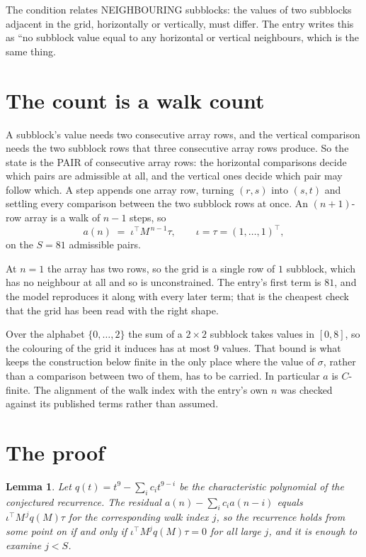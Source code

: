 \documentclass[11pt,a4paper]{article}
\theoremstyle{plain}
\newtheorem{lemma}[theorem]{Lemma}
\theoremstyle{definition}
\begin{document}
The condition relates NEIGHBOURING subblocks: the values of two subblocks adjacent in the grid,
horizontally or vertically, must differ. The entry writes this as ``no subblock value equal to any horizontal or vertical neighbours, which is the same thing.

\section{The count is a walk count}

A subblock's value needs two consecutive array rows, and the vertical
comparison needs the two subblock rows that three consecutive array rows produce. So the state
is the PAIR of consecutive array rows: the horizontal comparisons decide which pairs are
admissible at all, and the vertical ones decide which pair may follow which. A step appends one
array row, turning $(r,s)$ into $(s,t)$ and settling every comparison between the two subblock
rows at once. An $(n+1)$-row array is a walk of $n-1$ steps, so
\[
a(n)\;=\;\iota^{\!\top}M^{\,n-1}\tau,\qquad\iota=\tau=(1,\dots,1)^{\!\top},
\]
on the $S=81$ admissible pairs.

At $n=1$ the array has two rows, so the grid is a single row of $1$
subblock, which has no neighbour at all and so is unconstrained. The
entry's first term is $81$, and the model reproduces it along with every later term; that
is the cheapest check that the grid has been read with the right shape.

Over the alphabet $\{0,\dots,2\}$ the sum of a $2\times2$ subblock takes values in
$[0,8]$, so the colouring of the grid it induces has at most $9$ values.
That bound is what keeps the construction below finite in the only place where the value of
$\sigma$, rather than a comparison between two of them, has to be carried.
In particular $a$ is $C$-finite. The alignment of the walk index with the entry's own $n$ was
checked against its published terms rather than assumed.

\section{The proof}

\begin{lemma}\label{lem:crit}
Let $q(t)=t^{9}-\sum_i c_it^{9-i}$ be the characteristic polynomial of the
conjectured recurrence. The residual $a(n)-\sum_ic_ia(n-i)$ equals
$\iota^{\!\top}M^{\,j}q(M)\tau$ for the corresponding walk index $j$, so the recurrence
holds from some point on if and only if $\iota^{\!\top}M^{j}q(M)\tau=0$ for all large $j$,
and it is enough to examine $j<S$.
\end{lemma}
\end{document}
